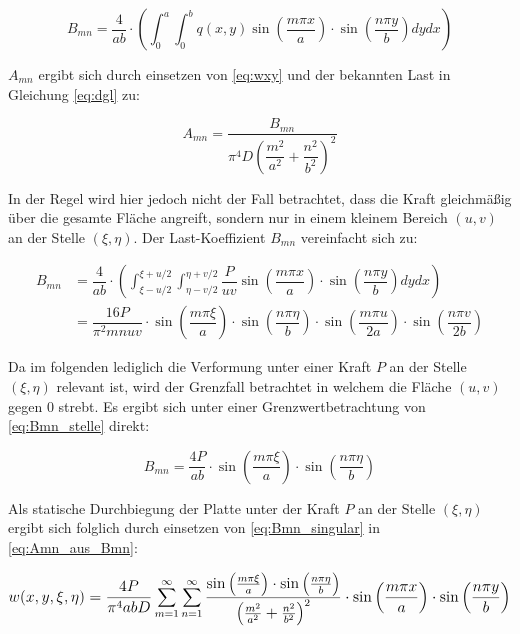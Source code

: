 \begin{equation}
B_{mn} = \dfrac{4}{ab} \cdot \left( \int_0^a \int_0^b q(x,y) 
\sin\left(\dfrac{m \pi x}{a}\right) \cdot \sin\left( \dfrac{n \pi y}{b}\right) dy dx\right)
\label{eq:Bmn_allgemein}
\end{equation}

$A_{mn}$ ergibt sich durch einsetzen von \ref{eq:wxy} und der bekannten Last in Gleichung \ref{eq:dgl} zu:

\begin{equation}
A_{mn} = \dfrac{B_{mn}}{\pi^4 D \left(\dfrac{m^2}{a^2} + \dfrac{n^2}{b^2} \right)^2}
\label{eq:Amn_aus_Bmn}
\end{equation}

In der Regel wird hier jedoch nicht der Fall betrachtet, dass die Kraft gleichmäßig über die gesamte Fläche angreift, sondern nur in einem kleinem Bereich $(u,v)$ an der Stelle $(\xi, \eta)$. Der Last-Koeffizient $B_{mn}$ vereinfacht sich zu:

\begin{align}
B_{mn} &= \dfrac{4}{ab} \cdot \left( \int_{\xi-u/2}^{\xi+u/2} \int_{\eta - v/2}^{\eta + v/2} \dfrac{P}{u v}
\sin\left(\dfrac{m \pi x}{a}\right) \cdot \sin\left( \dfrac{n \pi y}{b} \right)dy dx\right) \\
&= \dfrac{16P}{\pi^2 m n u v} 
\cdot \sin\left(\dfrac{m \pi \xi}{a}\right) 
\cdot \sin\left(\dfrac{n \pi \eta}{b}\right) 
\cdot \sin\left(\dfrac{m \pi u}{2a}\right) 
\cdot \sin\left(\dfrac{n \pi v}{2b}\right)
\label{eq:Bmn_stelle}
\end{align}

Da im folgenden lediglich die Verformung unter einer Kraft $P$ an der Stelle $(\xi, \eta)$ relevant ist, wird der Grenzfall betrachtet in welchem die Fläche $(u,v)$ gegen 0 strebt. Es ergibt sich unter einer Grenzwertbetrachtung von \ref{eq:Bmn_stelle} direkt:

\begin{equation}
B_{mn} = \dfrac{4P}{a b} 
\cdot \sin\left(\dfrac{m \pi \xi}{a}\right) 
\cdot \sin\left(\dfrac{n \pi \eta}{b}\right) 
\label{eq:Bmn_singular}
\end{equation}

Als statische Durchbiegung der Platte unter der Kraft $P$ an der Stelle $(\xi, \eta)$ ergibt sich folglich durch einsetzen von \ref{eq:Bmn_singular} in \ref{eq:Amn_aus_Bmn}:
 
\begin{equation}
 \mathlarger{
 	w(x,y,\xi,\eta) = \frac{4P}{\pi^4 a b D} 
 	\sum_{m = 1}^{\infty} \sum_{n = 1}^{\infty}
 	\frac{
 		\sin\left(\frac{m \pi \xi}{a}\right) 
 		\cdot \sin\left(\frac{n \pi \eta}{b}\right) 
 	}{
 		\left( 
 		\frac{m^2}{a^2} +
 		\frac{n^2}{b^2}
 		\right)^2
 	}
 	\cdot \sin\left(\frac{m \pi x}{a}\right) 
 	\cdot \sin\left(\frac{n \pi y}{b}\right) 
 }
 \end{equation}
 
